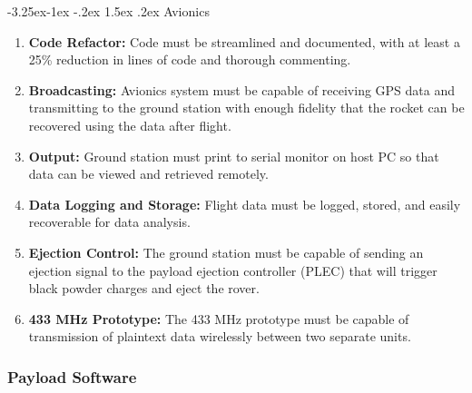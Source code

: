 \documentclass[onecolumn, draftclsnofoot, 10pt, compsoc]{IEEEtran}
\makeatletter
\renewcommand\paragraph{\@startsection{paragraph}{4}{\z@}%
                                     {-3.25ex\@plus -1ex \@minus -.2ex}%
                                     {1.5ex \@plus .2ex}%
                                     {\normalfont\normalsize\bfseries}}
\makeatother
\begin{document}
\paragraph{Avionics} \begin{enumerate}
\item \textbf{Code Refactor:} Code must be streamlined and documented, with at least a 25\% reduction in lines of code and thorough commenting. 
\item \textbf{Broadcasting:} Avionics system must be capable of receiving GPS data and transmitting to the ground station with enough fidelity that the rocket can be recovered using the data after flight.
\item \textbf{Output:} Ground station must print to serial monitor on host PC so that data can be viewed and retrieved remotely.
\item \textbf{Data Logging and Storage:} Flight data must be logged, stored, and easily recoverable for data analysis.
\item \textbf{Ejection Control:} The ground station must be capable of sending an ejection signal to the payload ejection controller (PLEC) that will trigger black powder charges and eject the rover.
\item \textbf{433 MHz Prototype:} The 433 MHz prototype must be capable of transmission of plaintext data wirelessly between two separate units.
\end{enumerate}
\subsubsection{Payload Software}
\end{document}
